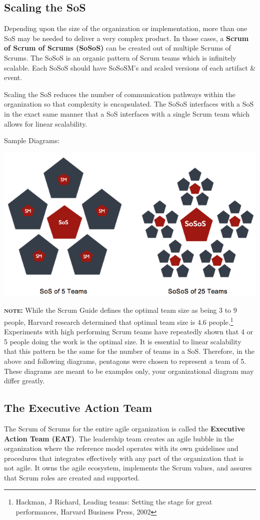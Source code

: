 \documentclass[12pt,a4paper,parskip=full]{scrartcl}
\begin{document}
\subsection{Scaling the SoS}
Depending upon the size of the organization or implementation, more than
one SoS may be needed to deliver a very complex product. In those cases, a
\textbf{Scrum of Scrum of Scrums (SoSoS)} can be created out of multiple
Scrums of Scrums. The SoSoS is an organic pattern of Scrum teams which is
infinitely scalable. Each SoSoS should have SoSoSM's and scaled versions of
each artifact \& event.

Scaling the SoS reduces the number of communication pathways within the
organization so that complexity is encapsulated. The SoSoS interfaces with
a SoS in the exact same manner that a SoS interfaces with a single Scrum
team which allows for linear scalability.

\pagebreak
Sample Diagrams:

\includegraphics[width=1.0\linewidth]{Sos-R2.png}

\textbf{\textsc{note:}} While the Scrum Guide defines the optimal team size as being
3 to 9 people, Harvard research determined that optimal team size is 4.6
people.\footnote{Hackman, J Richard, Leading teams: Setting the stage for
great performances, Harvard Business Press, 2002} Experiments with high
performing Scrum teams have repeatedly shown that 4 or 5 people doing the
work is the optimal size. It is essential to linear scalability that this
pattern be the same for the number of teams in a SoS. Therefore, in the
above and following diagrams, pentagons were chosen to represent a team of
5. These diagrams are meant to be examples only, your organizational
diagram may differ greatly.

\subsection{The Executive Action Team}
The Scrum of Scrums for the entire agile organization is called the
\textbf{Executive Action Team (EAT)}. The leadership team creates an agile bubble
in the organization where the reference model operates with 
its own guidelines and procedures that integrates effectively 
with any part of the organization that is not agile. It owns the agile ecosystem, 
implements the Scrum values, and assures that 
Scrum roles are created and supported.
\end{document}
